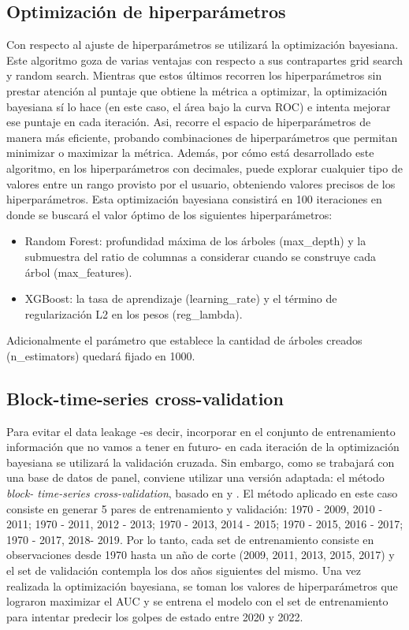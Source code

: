 \documentclass{article}
\begin{document}
\subsection{Optimización de hiperparámetros}
Con respecto al ajuste de hiperparámetros se utilizará la optimización bayesiana. Este
algoritmo goza de varias ventajas con respecto a sus contrapartes grid search y random
search. Mientras que estos últimos recorren los hiperparámetros
sin prestar atención al puntaje que obtiene la métrica a optimizar, la optimización bayesiana
sí lo hace (en este caso, el área bajo la curva ROC) e intenta mejorar ese
puntaje en cada iteración. Asi, recorre el espacio de hiperparámetros de manera más eficiente,
probando combinaciones de hiperparámetros que permitan minimizar o maximizar la métrica.
Además, por cómo está desarrollado este algoritmo, en los hiperparámetros con decimales, puede
explorar cualquier tipo de valores entre un rango provisto por el usuario, obteniendo valores
precisos de los hiperparámetros. Esta optimización bayesiana consistirá en 100 
iteraciones en donde se buscará el valor óptimo de los siguientes hiperparámetros:

\begin{itemize}
  \item Random Forest: profundidad máxima de los árboles (max\_depth) y la 
  submuestra del ratio de columnas a considerar cuando se construye cada árbol 
  (max\_features).
  \item XGBoost: la tasa de aprendizaje (learning\_rate) y el término de 
  regularización L2 en los pesos (reg\_lambda).
\end{itemize}

Adicionalmente el parámetro que establece la cantidad de árboles creados 
(n\_estimators) quedará fijado en 1000.

\subsection{Block-time-series cross-validation}
Para evitar el data leakage -es decir, incorporar en el conjunto de entrenamiento
información que no vamos a tener en futuro- en cada iteración de la optimización bayesiana
se utilizará la validación cruzada. Sin embargo, como se trabajará con una base
de datos de panel, conviene utilizar una versión adaptada: el método \textit{block-
time-series cross-validation}, basado en \cite{Bur94} y \cite{RAc00}. El método 
aplicado en este caso consiste en generar 5 pares de entrenamiento y validación: 
{1970 - 2009, 2010 - 2011}; {1970 - 2011, 2012 - 2013}; {1970 - 2013, 2014 - 2015}; 
{1970 - 2015, 2016 - 2017}; {1970 - 2017, 2018- 2019}. Por lo tanto, cada set de 
entrenamiento consiste en observaciones desde 1970 hasta un año de corte (2009, 
2011, 2013, 2015, 2017) y el set de validación contempla los dos años siguientes 
del mismo. Una vez realizada la optimización bayesiana, se toman los valores de 
hiperparámetros que lograron maximizar el AUC y se entrena el modelo con el set de 
entrenamiento para intentar predecir los golpes de estado entre 2020 y 2022. 
\end{document}
